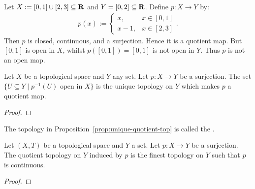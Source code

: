 \begin{example}
    Let $X:= [0,1] \cup [2,3] \subseteq \mathbf{R}$ and $Y = [0,2] \subseteq \mathbf{R}$. Define $p:X \rightarrow Y$ by:
        \begin{equation*}
        \begin{split}
            p(x):=\begin{cases}
            x, &x \in [0,1] \\
            x-1, &x \in [2,3]
            \end{cases}.
        \end{split}
        \end{equation*}
    Then $p$ is closed, continuous, and a surjection. Hence it is a quotient map. But $[0,1]$ is open in $X$, whilst $p([0,1]) = [0,1]$ is not open in $Y$. Thus $p$ is not an open map.
\end{example}

\begin{proposition}\label{prop:unique-quotient-top}
    Let $X$ be a topological space and $Y$ any set. Let $p:X \rightarrow Y$ be a surjection. The set $\{U \subseteq Y \mid p^{-1}(U) \text{ open in $X$} \}$ is the unique topology on $Y$ which makes $p$ a quotient map.
\end{proposition}
    {\color{red} \begin{proof}
        
    \end{proof}}

\begin{definition}
    The topology in Proposition~\ref{prop:unique-quotient-top} is called the  .
\end{definition}

\begin{proposition}
    Let $(X,T)$ be a topological space and $Y$ a set. Let $p:X \rightarrow Y$ be a surjection. The quotient topology on $Y$ induced by $p$ is the finest topology on $Y$ such that $p$ is continuous.
\end{proposition}
    {\color{red} \begin{proof}
        
    \end{proof}}

